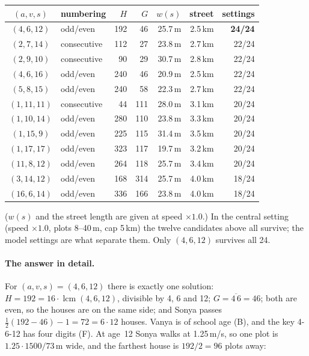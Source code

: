\documentclass[11pt,a4paper]{article}
\DeclareMathOperator{\lcm}{lcm}
\begin{document}
\begin{center}
\begin{tabular}{@{}clrrrrr@{}}
\toprule
$(a,v,s)$ & numbering & $H$ & $G$ & $w(s)$ & street & settings \\
\midrule
$(4,6,12)$   & odd/even    & 192 & 46  & 25.7\,m & 2.5\,km & \textbf{24/24} \\
$(2,7,14)$   & consecutive & 112 & 27  & 23.8\,m & 2.7\,km & 22/24 \\
$(2,9,10)$   & consecutive & 90  & 29  & 30.7\,m & 2.8\,km & 22/24 \\
$(4,6,16)$   & odd/even    & 240 & 46  & 20.9\,m & 2.5\,km & 22/24 \\
$(5,8,15)$   & odd/even    & 240 & 58  & 22.3\,m & 2.7\,km & 22/24 \\
$(1,11,11)$  & consecutive & 44  & 111 & 28.0\,m & 3.1\,km & 20/24 \\
$(1,10,14)$  & odd/even    & 280 & 110 & 23.8\,m & 3.3\,km & 20/24 \\
$(1,15,9)$   & odd/even    & 225 & 115 & 31.4\,m & 3.5\,km & 20/24 \\
$(1,17,17)$  & odd/even    & 323 & 117 & 19.7\,m & 3.2\,km & 20/24 \\
$(11,8,12)$  & odd/even    & 264 & 118 & 25.7\,m & 3.4\,km & 20/24 \\
$(3,14,12)$  & odd/even    & 168 & 314 & 25.7\,m & 4.0\,km & 18/24 \\
$(16,6,14)$  & odd/even    & 336 & 166 & 23.8\,m & 4.0\,km & 18/24 \\
\bottomrule
\end{tabular}
\end{center}

\noindent ($w(s)$ and the street length are given at speed $\times1.0$.) In the central setting (speed
$\times1.0$, plots 8--40\,m, cap 5\,km) the twelve candidates above all survive; the model settings are what
separate them. Only $(4,6,12)$ survives all 24.

\paragraph{The answer in detail.} For $(a,v,s)=(4,6,12)$ there is exactly one solution: $H=192=16\cdot\lcm(4,6,12)$,
divisible by 4, 6 and 12; $G=\overline{4\,6}=46$; both are even, so the houses are on the same side; and Sonya
passes $\tfrac12(192-46)-1=72=6\cdot12$ houses. Vanya is of school age (B), and the key 4-6-12 has four digits (F).
At age~12 Sonya walks at 1.25\,m/s, so one plot is $1.25\cdot1500/73$\,m wide, and the farthest house is
$192/2=96$ plots away:
\end{document}
